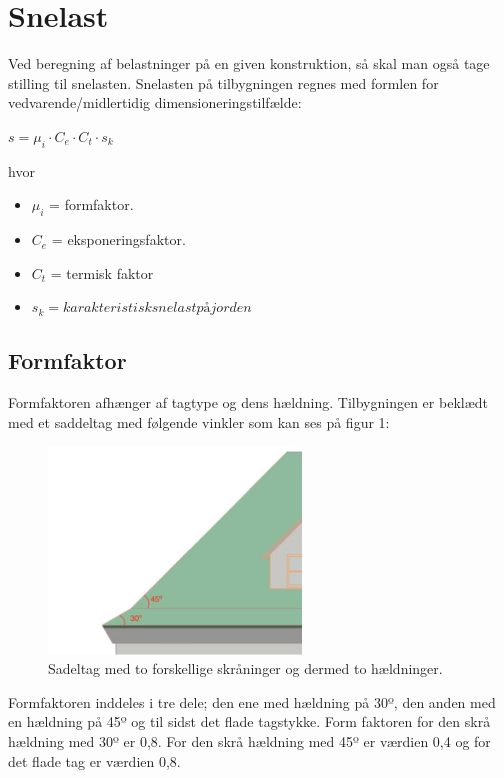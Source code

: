 \chapter{Snelast}
Ved beregning af belastninger på en given konstruktion, så skal man også tage stilling til snelasten. Snelasten på tilbygningen regnes med formlen for vedvarende/midlertidig dimensioneringstilfælde:

$s = \mu_i \cdot C_e  \cdot  C_t \cdot s_k$

hvor

\begin{itemize}
\item $\mu_i$ = formfaktor.
\item $C_e$ = eksponeringsfaktor.
\item $C_t$ = termisk faktor
\item $s_k = karakteristisk snelast på jorden$
\end{itemize}


\section{Formfaktor}
Formfaktoren afhænger af tagtype og dens hældning. Tilbygningen er beklædt med et saddeltag med følgende vinkler som kan ses på figur 1: 

\begin{figure}[H] 
\centering
\includegraphics[width=0.60\textwidth]{billeder/SnelastFigur1}
\caption{Sadeltag med to forskellige skråninger og dermed to hældninger.}
\label{fig:SF1}
\end{figure}

Formfaktoren inddeles i tre dele; den ene med hældning på 30º, den anden med en hældning på 45º og til sidst det flade tagstykke. Form faktoren for den skrå hældning med 30º er 0,8. For den skrå hældning med 45º er værdien 0,4 og for det flade tag er værdien 0,8. 

